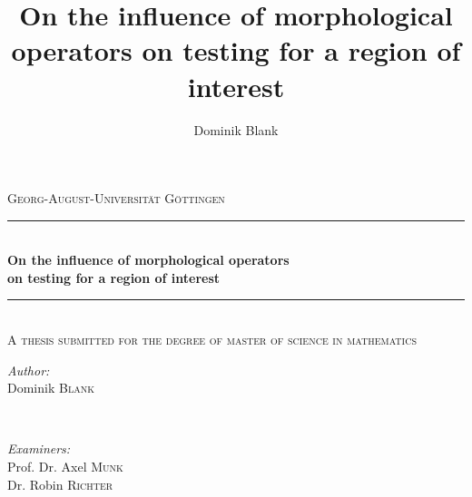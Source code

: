 \documentclass[a4paper,12pt]{article}
\author{Dominik Blank}
\title{On the influence of morphological operators on testing for a region of interest}
\theoremstyle{plain}
\theoremstyle{definition}
\numberwithin{equation}{section}
\begin{document}
\begin{titlepage}

\newcommand{\HRule}{\rule{\linewidth}{0.5mm}} %

\center %
 

\textsc{\Large Georg-August-Universität Göttingen}\\[1.5cm] %


\HRule \\[0.4cm]
{\large \bfseries On the influence of morphological operators\\ on testing for a region of interest}\\[0.2cm] %
\HRule \\[1cm]
\textsc{\large A thesis submitted for the degree of master of science in mathematics}\\[2cm] %


\begin{minipage}[t]{0.3\textwidth}
\begin{flushleft} \large
\emph{Author:}\\
Dominik \textsc{Blank}
\end{flushleft}
\end{minipage}
~
\begin{minipage}[t]{0.6\textwidth}
\begin{flushright} \large
\emph{Examiners:} \\
Prof. Dr. Axel \textsc{Munk}\\
Dr. Robin \textsc{Richter}
\end{flushright}
\end{minipage}\\[4cm]


\end{titlepage}
\end{document}
